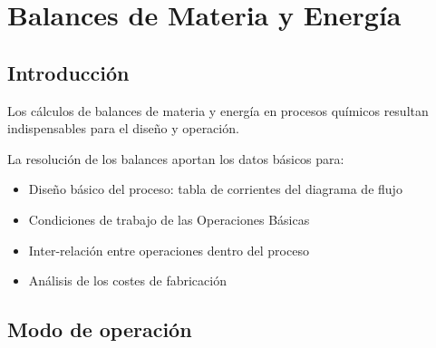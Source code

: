 \chapter{Balances de Materia y Energía}
\section{Introducción}
Los cálculos de balances de materia y energía en procesos químicos resultan indispensables para el diseño y operación.

La resolución de los balances aportan los datos básicos para:
\begin{itemize}
    \item Diseño básico del proceso: tabla de corrientes del diagrama de flujo
    \item Condiciones de trabajo de las Operaciones Básicas
    \item Inter-relación entre operaciones dentro del proceso
    \item Análisis de los costes de fabricación
\end{itemize}

\section{Modo de operación}

